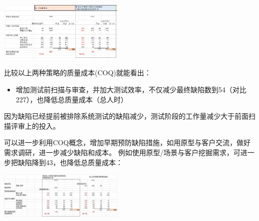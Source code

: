 \includegraphics[width=6cm]{AR1FixVarCostScreenshot_2022-12-10_144400.jpg}

比较以上两种策略的质量成本(COQ)就能看出：

\begin{itemize}
\tightlist
\item
  增加测试前扫描与审查，并加大测试效率，不仅减少最终缺陷数到54（对比227），也降低总质量成本（总人时）
\end{itemize}



因为缺陷已经提前被排除系统测试的缺陷减少，测试阶段的工作量减少大于前面扫描评审上的投入。

可以进一步利用COQ概念，增加早期预防缺陷措施，如用原型与客户交流，做好需求调研，进一步减少缺陷和成本。
例如使用原型/场景与客户挖掘需求，可进一步把缺陷降到43，也降低总质量成本：


\includegraphics[width=6cm]{est缺陷表3.jpg}

